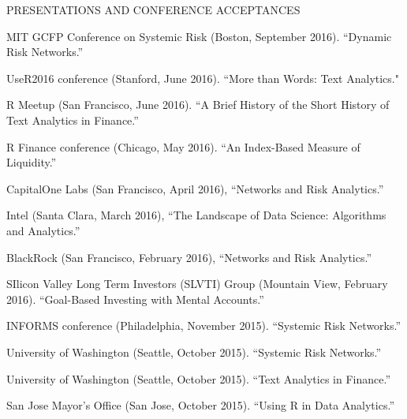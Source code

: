 \documentclass{article}
\begin{document}
\begin{description} 
\item[PRESENTATIONS AND CONFERENCE ACCEPTANCES] \mbox{}
\end{description}

\begin{etaremune}
\setlength\itemsep{-0.4em}

{\small


\item MIT GCFP Conference on Systemic Risk (Boston, September 2016). ``Dynamic Risk Networks.''

\item UseR2016 conference (Stanford, June 2016). ``More than Words: Text Analytics."

\item R Meetup (San Francisco, June 2016). ``A Brief History of the Short History of Text Analytics in Finance.''

\item R Finance conference (Chicago, May 2016). ``An Index-Based Measure of Liquidity.''

\item CapitalOne Labs (San Francisco, April 2016), ``Networks and Risk Analytics.''

\item Intel (Santa Clara, March 2016), ``The Landscape of Data Science: Algorithms and Analytics.''

\item BlackRock (San Francisco, February 2016), ``Networks and Risk Analytics.''

\item SIlicon Valley Long Term Investors (SLVTI) Group (Mountain View, February 2016). ``Goal-Based Investing with Mental Accounts.''


\item INFORMS conference (Philadelphia, November 2015). ``Systemic Risk Networks.''

\item University of Washington (Seattle, October 2015). ``Systemic Risk Networks.''

\item University of Washington (Seattle, October 2015). ``Text Analytics in Finance.''

\item San Jose Mayor's Office (San Jose, October 2015). ``Using R in Data Analytics.''

}
\end{etaremune}
\end{document}
